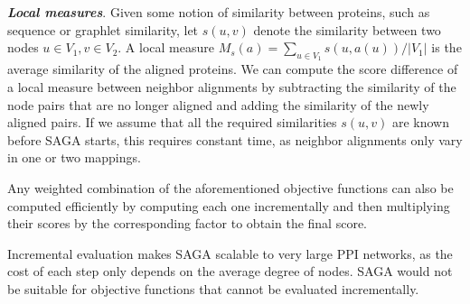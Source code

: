 \documentclass{bioinfo}
\begin{document}
\begin{methods}
\emph{\textbf{Local measures}}. Given some notion of similarity between proteins, such as sequence or graphlet similarity, let $s(u,v)$ denote the similarity between two nodes $u\in V_1, v\in V_2$. A local measure
$M_s(a)=\sum_{u\in V_1} s(u,a(u))/|V_1|$
is the average similarity of the aligned proteins.
We can compute the score difference of a local measure between neighbor alignments by subtracting the similarity of the node pairs that are no longer aligned and adding the similarity of the newly aligned pairs. If we assume that all the required similarities $s(u,v)$ are known before SAGA starts, this requires constant time, as neighbor alignments only vary in one or two mappings.

Any weighted combination of the aforementioned objective functions can also be computed efficiently by computing each one incrementally and then multiplying their scores by the corresponding factor to obtain the final score.

Incremental evaluation makes SAGA scalable to very large PPI networks, as the cost of each step only depends on the average degree of nodes. SAGA would not be suitable for objective functions that cannot be evaluated incrementally.



\end{methods}
\end{document}
